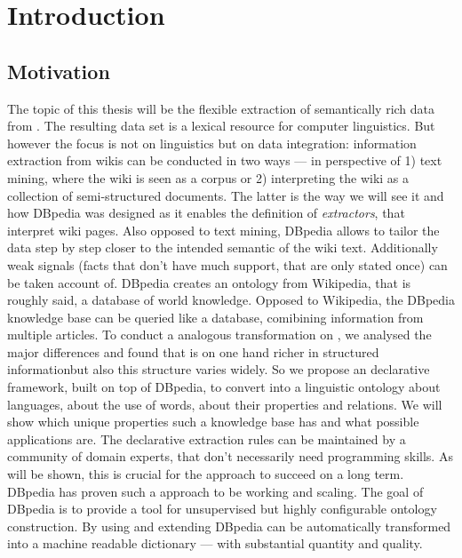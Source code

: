 \section{Introduction}

\subsection{Motivation}

The topic of this thesis will be the flexible extraction of semantically rich data from \wik.
The resulting data set is a lexical resource for computer linguistics.
But however the focus is not on linguistics but on data integration: information extraction from wikis can be conducted in two ways --- in perspective of 1) text mining, where the wiki is seen as a corpus or 2) interpreting the wiki as a collection of semi-structured documents.
The latter is the way we will see it and how DBpedia was designed as it enables the definition of \textit{extractors}, that interpret wiki pages.
Also opposed to text mining, DBpedia allows to tailor the data step by step closer to the intended semantic of the wiki text.
Additionally weak signals (facts that don't have much support, that are only stated once) can be taken account of.
DBpedia creates an ontology from Wikipedia, that is roughly said, a database of world knowledge.
Opposed to Wikipedia, the DBpedia knowledge base can be queried like a database, comibining information from multiple articles.
To conduct a analogous transformation on \wik, we analysed the major differences and found that \wik is on one hand richer in structured informationbut also  this structure varies widely.
So we propose an declarative framework, built on top of DBpedia, to convert \wik into a linguistic ontology about languages, about the use of words, about their properties and relations.
We will show which unique properties such a knowledge base has and what possible applications are.
The declarative extraction rules can be maintained by a community of domain experts, that don't necessarily need programming skills.
As will be shown, this is crucial for the approach to succeed on a long term.
DBpedia has proven such a approach to be working and scaling.
The goal of DBpedia is to provide a tool for unsupervised but highly configurable ontology construction.
By using and extending DBpedia \wik can be automatically transformed into a machine readable dictionary --- with substantial quantity and quality.


